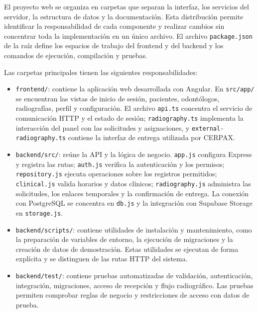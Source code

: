 
El proyecto web se organiza en carpetas que separan la interfaz, los
servicios del servidor, la estructura de datos y la documentación. Esta
distribución permite identificar la responsabilidad de cada componente y
realizar cambios sin concentrar toda la implementación en un único archivo.
El archivo \texttt{package.json} de la raíz define los espacios de trabajo
del frontend y del backend y los comandos de ejecución, compilación y pruebas.

Las carpetas principales tienen las siguientes responsabilidades:

\begin{itemize}
  \item \texttt{frontend/}: contiene la aplicación web desarrollada con
  Angular. En \texttt{src/app/} se encuentran las vistas de inicio de sesión,
  pacientes, odontólogos, radiografías, perfil y configuración. El archivo
  \texttt{api.ts} concentra el servicio de comunicación HTTP y el estado de
  sesión; \texttt{radiography.ts} implementa la interacción del panel con
  las solicitudes y asignaciones, y \texttt{external-radiography.ts}
  contiene la interfaz de entrega utilizada por CERPAX.

  \item \texttt{backend/src/}: reúne la API y la lógica de negocio.
  \texttt{app.js} configura Express y registra las rutas;
  \texttt{auth.js} verifica la autenticación y los permisos;
  \texttt{repository.js} ejecuta operaciones sobre los registros permitidos;
  \texttt{clinical.js} valida horarios y datos clínicos;
  \texttt{radiography.js} administra las solicitudes, los enlaces temporales
  y la confirmación de entrega. La conexión con PostgreSQL se concentra en
  \texttt{db.js} y la integración con Supabase Storage en \texttt{storage.js}.

  \item \texttt{backend/scripts/}: contiene utilidades de instalación y
  mantenimiento, como la preparación de variables de entorno, la ejecución
  de migraciones y la creación de datos de demostración. Estas utilidades
  se ejecutan de forma explícita y se distinguen de las rutas HTTP del sistema.

  \item \texttt{backend/test/}: contiene pruebas automatizadas de validación,
  autenticación, integración, migraciones, acceso de recepción y flujo
  radiográfico. Las pruebas permiten comprobar reglas de negocio y
  restricciones de acceso con datos de prueba.


\end{itemize}
